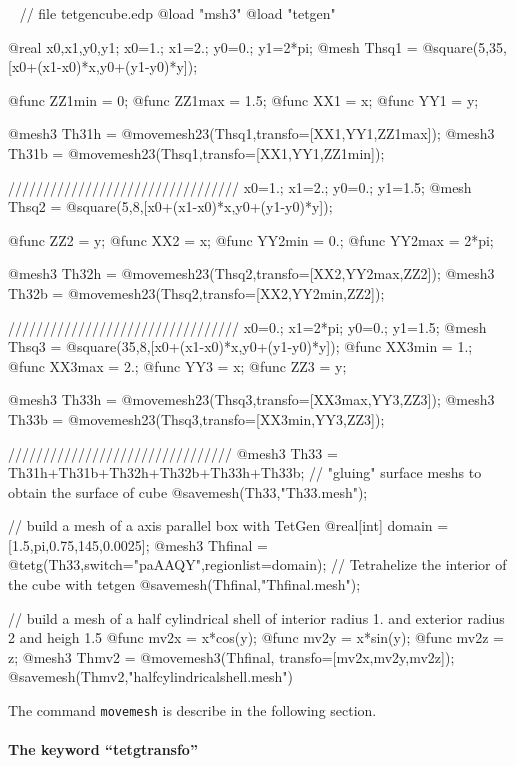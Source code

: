 \documentclass[a4paper,twoside,12pt]{book}
\begin{document}
\begin{example}
\label{tetgenboxedp}~
\bFF
// file tetgencube.edp
@load "msh3"
@load "tetgen"

@real x0,x1,y0,y1;
x0=1.; x1=2.; y0=0.; y1=2*pi;
@mesh Thsq1 = @square(5,35,[x0+(x1-x0)*x,y0+(y1-y0)*y]);

@func ZZ1min = 0;
@func ZZ1max = 1.5;
@func XX1 = x;
@func YY1 = y;

@mesh3 Th31h = @movemesh23(Thsq1,transfo=[XX1,YY1,ZZ1max]);
@mesh3 Th31b = @movemesh23(Thsq1,transfo=[XX1,YY1,ZZ1min]);

/////////////////////////////////
x0=1.; x1=2.; y0=0.; y1=1.5;
@mesh Thsq2 = @square(5,8,[x0+(x1-x0)*x,y0+(y1-y0)*y]);

@func ZZ2 = y;
@func XX2 = x;
@func YY2min = 0.;
@func YY2max = 2*pi;

@mesh3 Th32h = @movemesh23(Thsq2,transfo=[XX2,YY2max,ZZ2]);
@mesh3 Th32b = @movemesh23(Thsq2,transfo=[XX2,YY2min,ZZ2]);

/////////////////////////////////
x0=0.; x1=2*pi; y0=0.; y1=1.5;
@mesh Thsq3 = @square(35,8,[x0+(x1-x0)*x,y0+(y1-y0)*y]);
@func XX3min = 1.;
@func XX3max = 2.;
@func YY3 = x;
@func ZZ3 = y;

@mesh3 Th33h = @movemesh23(Thsq3,transfo=[XX3max,YY3,ZZ3]);
@mesh3 Th33b = @movemesh23(Thsq3,transfo=[XX3min,YY3,ZZ3]);

////////////////////////////////
@mesh3 Th33 = Th31h+Th31b+Th32h+Th32b+Th33h+Th33b; // "gluing" surface meshs to obtain the surface of cube
@savemesh(Th33,"Th33.mesh");

// build a mesh of a axis parallel box with TetGen
@real[int] domain =[1.5,pi,0.75,145,0.0025];
@mesh3 Thfinal = @tetg(Th33,switch="paAAQY",regionlist=domain);    // Tetrahelize the interior of the cube with tetgen
@savemesh(Thfinal,"Thfinal.mesh");

// build a mesh of a half cylindrical shell of interior radius 1. and exterior radius 2 and heigh 1.5
@func mv2x = x*cos(y);
@func mv2y = x*sin(y);
@func mv2z = z;
@mesh3 Thmv2 = @movemesh3(Thfinal, transfo=[mv2x,mv2y,mv2z]);
@savemesh(Thmv2,"halfcylindricalshell.mesh")
\eFF
\end{example}
The command \texttt{movemesh} is describe in the following section.


\paragraph{The keyword ``tetgtransfo''} 
\end{document}

